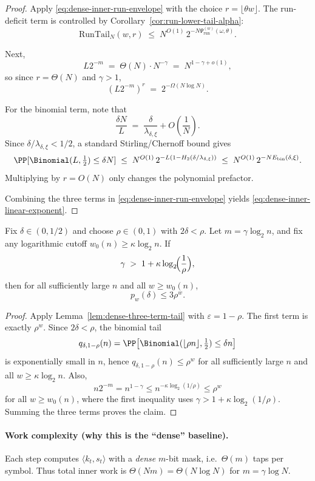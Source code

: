 \begin{proof}
Apply \eqref{eq:dense-inner-run-envelope} with the choice $r=\lfloor \theta w\rfloor$.
The run-deficit term is controlled by Corollary~\ref{cor:run-lower-tail-alpha}:
\[
\mathrm{RunTail}_N(w,r)
\;\le\;
N^{O(1)}\,2^{-N\Psi_{\mathrm{run}}^{(w)}(\omega,\theta)}.
\]

Next,
\[
L2^{-m}
\;=\;
\Theta(N)\cdot N^{-\gamma}
\;=\;
N^{1-\gamma+o(1)},
\]
so since $r=\Theta(N)$ and $\gamma>1$,
\[
(L2^{-m})^r
\;=\;
2^{-\Omega(N\log N)}.
\]

For the binomial term, note that
\[
\frac{\delta N}{L}
\;=\;
\frac{\delta}{\lambda_{\delta,\xi}}+O\!\left(\frac{1}{N}\right).
\]
Since \(\delta/\lambda_{\delta,\xi}<1/2\), a standard Stirling/Chernoff bound gives
\[
\PP[\Binomial(L,\tfrac12)\le \delta N]
\;\le\;
N^{O(1)}\,2^{-L\left(1-H_2(\delta/\lambda_{\delta,\xi})\right)}
\;\le\;
N^{O(1)}\,2^{-N E_{\mathrm{bin}}(\delta,\xi)}.
\]
Multiplying by $r=O(N)$ only changes the polynomial prefactor.

Combining the three terms in \eqref{eq:dense-inner-run-envelope} yields
\eqref{eq:dense-inner-linear-exponent}.
\end{proof}




\begin{corollary}
\label{cor:dense-inner-constant-geometric}
Fix \(\delta\in(0,1/2)\) and choose \(\rho\in(0,1)\) with \(2\delta<\rho\).
Let \(m=\gamma\log_2 n\), and fix any logarithmic cutoff \(w_0(n)\ge \kappa\log_2 n\).
If
\[
\gamma \;>\; 1+\kappa\log_2\!\Bigl(\frac{1}{\rho}\Bigr),
\]
then for all sufficiently large \(n\) and all \(w\ge w_0(n)\),
\[
p_w(\delta)\le 3\rho^w.
\]
\end{corollary}

\begin{proof}
Apply Lemma~\ref{lem:dense-three-term-tail} with \(\varepsilon=1-\rho\).
The first term is exactly \(\rho^w\).
Since \(2\delta<\rho\), the binomial tail
\[
q_{\delta,1-\rho}(n)
=
\PP\!\left[\Binomial(\lfloor \rho n\rfloor,\tfrac12)\le \delta n\right]
\]
is exponentially small in \(n\), hence \(q_{\delta,1-\rho}(n)\le \rho^w\) for all sufficiently large \(n\) and all
\(w\ge \kappa\log_2 n\).
Also,
\[
n2^{-m}=n^{1-\gamma}
\le
n^{-\kappa\log_2(1/\rho)}
\le
\rho^w
\]
for all \(w\ge w_0(n)\), where the first inequality uses
\(\gamma>1+\kappa\log_2(1/\rho)\).
Summing the three terms proves the claim.
\end{proof}

\paragraph{Work complexity (why this is the ``dense'' baseline).}
Each step computes $\langle k_t,s_t\rangle$ with a \emph{dense} $m$-bit mask, i.e.\ $\Theta(m)$ taps per symbol.
Thus total inner work is $\Theta(Nm)=\Theta(N\log N)$ for $m=\gamma\log N$.

